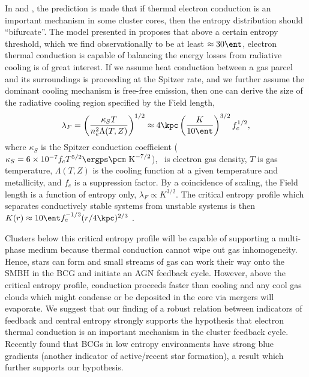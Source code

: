 \documentclass{emulateapj}
\begin{document}
In \cite{radioquiet} and \cite{conduction}, the prediction is made
that if thermal electron conduction is an important mechanism in some
cluster cores, then the entropy distribution should ``bifurcate''. The
model presented in \cite{conduction} proposes that above a certain
entropy threshold, which we find observationally to be at least
$\approx 30 \ent$, electron thermal conduction is capable of balancing
the energy losses from radiative cooling is of great interest. If we
assume heat conduction between a gas parcel and its surroundings is
proceeding at the Spitzer rate, and we further assume the dominant
cooling mechanism is free-free emission, then one can derive the size
of the radiative cooling region specified by the Field length,
\begin{equation}
\lambda_F = \left(\frac{\kappa_S T}{n_e^2 \Lambda(T,Z)}\right)^{1/2} \approx 4 \kpc \left(\frac{K}{10 \ent}\right)^{3/2}f_c^{1/2}, \nonumber
\end{equation}
where $\kappa_S$ is the Spitzer conduction coefficient ($\kappa_S =
6\times10^{-7} f_c T^{5/2} \ergps \pcm \mathrm{~K}^{-7/2}$), \nelec\
is electron gas density, $T$ is gas temperature, $\Lambda(T,Z)$ is the
cooling function at a given temperature and metallicity, and $f_c$ is
a suppression factor. By a coincidence of scaling, the Field length is
a function of entropy only, $\lambda_F \propto K^{3/2}$. The critical
entropy profile which separates conductively stable systems from
unstable systems is then $K(r) \approx 10 \ent f_c^{-1/3}
(r/4\kpc)^{2/3}$ \citep{radioquiet}.

Clusters below this critical entropy profile will be capable of
supporting a multi-phase medium because thermal conduction cannot wipe
out gas inhomogeneity. Hence, stars can form and small streams of gas
can work their way onto the SMBH in the BCG and initiate an AGN
feedback cycle. However, above the critical entropy profile,
conduction proceeds faster than cooling and any cool gas clouds which
might condense or be deposited in the core via mergers will evaporate.
We suggest that our finding of a robust relation between indicators of
feedback and central entropy strongly supports the hypothesis that
electron thermal conduction is an important mechanism in the cluster
feedback cycle. Recently \cite{2008arXiv0802.1864R} found that BCGs in
low entropy environments have strong blue gradients (another indicator
of active/recent star formation), a result which further supports our
hypothesis.
\end{document}
